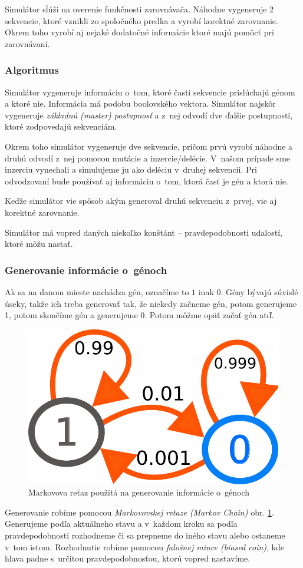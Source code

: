 Simulátor sĺúži na overenie funkčnosti zarovnávača. Náhodne vygeneruje 2 sekvencie, ktoré vznikli zo spoločného predka a vyrobí korektné zarovnanie. Okrem toho vyrobí aj nejaké dodatočné informácie ktoré majú pomôcť pri zarovnávaní.

\subsubsection{Algoritmus}
Simulátor vygeneruje informáciu o~tom, ktoré časti sekvencie prislúchajú génom a ktoré nie. Informácia má podobu boolovského vektora.
Simulátor najskôr vygeneruje \textit{základnú (master) postupnosť} a z~nej odvodí dve ďalšie postupnosti, ktoré zodpovedajú sekvenciám.

Okrem toho simulátor vygeneruje dve sekvencie, pričom prvú vyrobí náhodne a druhú odvodí z~nej pomocou mutácie a inzercie/delécie.
V~našom prípade sme inzerciu vynechali a simulujeme ju ako deléciu v~druhej sekvencii.
Pri odvodzovaní bude používať aj informáciu o~tom, ktorá časť je gén a ktorá nie.

Keďže simulátor vie spôsob akým generoval druhú sekvenciu z~prvej, vie aj korektné zarovnanie.

Simulátor má vopred daných niekoľko konštánt -- pravdepodobnosti udalostí, ktoré môžu nastať.

\subsubsection{Generovanie informácie o~génoch}
Ak sa na danom mieste nachádza gén, označíme to $1$ inak $0$.
Gény bývajú súvislé úseky, takže ich treba generovať tak, že niekedy začneme gén, potom generujeme 1, potom skončíme gén a generujeme 0. Potom môžme opäť začať gén atď.

\begin{figure}[htp]
    \centering
    \includegraphics[width=.3\textwidth]{images/markov_chain}
    \caption{Markovova reťaz použitá na generovanie informácie o~génoch}
    \label{fig:markov-chain}
\end{figure}

Generovanie robíme pomocou \textit{Markovovskej reťaze (Markov Chain)} obr. \ref{fig:markov-chain}. Generujeme podľa aktuálneho stavu a v~každom kroku sa podľa pravdepodobnosti rozhodneme či sa prepneme do iného stavu alebo ostaneme v~tom istom. Rozhodnutie robíme pomocou \textit{falošnej mince (biased coin)}, kde hlava padne s~určitou pravdepodobnosťou, ktorú vopred nastavíme.

